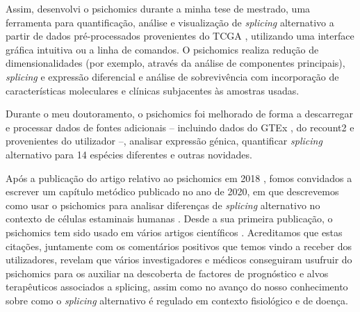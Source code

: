 Assim, desenvolvi o psichomics durante a minha tese de mestrado, uma ferramenta para quantificação, análise e visualização de \emph{splicing} alternativo a partir de dados pré-processados provenientes do TCGA \cite{chang:2013ww}, utilizando uma interface gráfica intuitiva ou a linha de comandos. O psichomics realiza redução de dimensionalidades (por exemplo, através da análise de componentes principais), \emph{splicing} e expressão diferencial e análise de sobrevivência com incorporação de características moleculares e clínicas subjacentes às amostras usadas.

Durante o meu doutoramento, o psichomics foi melhorado de forma a descarregar e processar dados de fontes adicionais -- incluindo dados do GTEx \cite{lonsdale:2013uo}, do recount2 \cite{collado-torres:2017uw} e provenientes do utilizador --, analisar expressão génica, quantificar \emph{splicing} alternativo para 14 espécies diferentes e outras novidades.


Após a publicação do artigo relativo ao psichomics em 2018 \cite{saraiva-agostinho:2018uq}, fomos convidados a escrever um capítulo metódico publicado no ano de 2020, em que descrevemos como usar o psichomics para analisar diferenças de \emph{splicing} alternativo no contexto de células estaminais humanas \cite{saraiva-agostinho:2020wz}. Desde a sua primeira publicação, o psichomics tem sido usado em vários artigos científicos \cite{coomer:2019wz,baeza-centurion:2019tb,munkley:2019wr,baeza-centurion:2020vb}. Acreditamos que estas citações, juntamente com os comentários positivos que temos vindo a receber dos utilizadores, revelam que vários investigadores e médicos conseguiram usufruir do psichomics para os auxiliar na descoberta de factores de prognóstico e alvos terapêuticos associados a splicing, assim como no avanço do nosso conhecimento sobre como o \emph{splicing} alternativo é regulado em contexto fisiológico e de doença.

